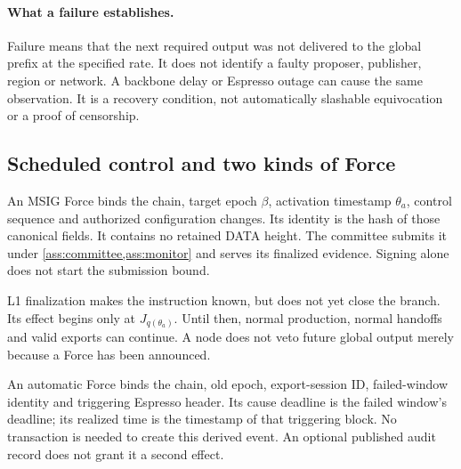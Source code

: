 \documentclass[11pt,a4paper]{article}
\begin{document}
\paragraph{What a failure establishes.}
Failure means that the next required output was not delivered to the
global prefix at the specified rate. It does not identify a faulty
proposer, publisher, region or network. A backbone delay or Espresso
outage can cause the same observation. It is a recovery condition,
not automatically slashable equivocation or a proof of censorship.

\subsection{Scheduled control and two kinds of Force}
\label{sec:force-stages}
An MSIG Force binds the chain, target epoch $\beta$, activation
timestamp $\theta_a$, control sequence and authorized configuration
changes. Its identity is the hash of those canonical fields. It
contains no retained DATA height. The committee submits it under
\cref{ass:committee,ass:monitor} and serves its finalized evidence.
Signing alone does not start the submission bound.

L1 finalization makes the instruction known, but does not yet close
the branch. Its effect begins only at $J_{q(\theta_a)}$.
Until then, normal production, normal handoffs and valid exports can
continue. A node does not veto future global output merely because a
Force has been announced.

An automatic Force binds the chain, old epoch, export-session ID,
failed-window identity and triggering Espresso header. Its cause
deadline is the failed window's deadline; its realized time is the
timestamp of that triggering block. No transaction is needed to create
this derived event. An optional published audit record does not grant
it a second effect.
\end{document}
